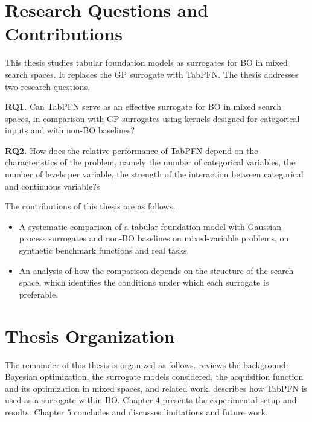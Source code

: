 \section{Research Questions and Contributions}

This thesis studies tabular foundation models as surrogates for BO in mixed search spaces. It replaces the GP surrogate with TabPFN. The thesis addresses two research questions.

\textbf{RQ1.} Can TabPFN serve as an effective surrogate for BO in mixed search spaces, in comparison with GP surrogates using kernels designed for categorical inputs and with non-BO baselines?

\textbf{RQ2.} How does the relative performance of TabPFN depend on the characteristics of the problem, namely the number of categorical variables, the number of levels per variable, the strength of the interaction between categorical and continuous variable?s%

The contributions of this thesis are as follows.

\begin{itemize}
    \item A systematic comparison of a tabular foundation model with Gaussian process surrogates and non-BO baselines on mixed-variable problems, on synthetic benchmark functions and real tasks.
    \item An analysis of how the comparison depends on the structure of the search space, which identifies the conditions under which each surrogate is preferable.
\end{itemize}

\section{Thesis Organization}

The remainder of this thesis is organized as follows.  reviews the background: Bayesian optimization, the surrogate models considered, the acquisition function and its optimization in mixed spaces, and related work.  describes how TabPFN is used as a surrogate within BO. Chapter 4 presents the experimental setup and results. Chapter 5 concludes and discusses limitations and future work.
